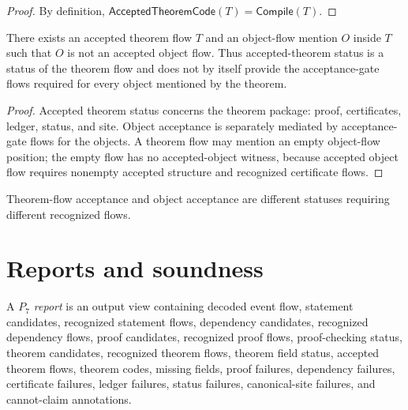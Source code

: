 \begin{proof}
By definition, $\mathsf{AcceptedTheoremCode}(T)=\mathsf{Compile}(T)$.
\end{proof}

\begin{theorem}
\label{thm:theorem-proof-accepted-theorem-not-object}
There exists an accepted theorem flow $T$ and an object-flow mention $O$ inside $T$ such that $O$ is not an accepted object flow. Thus accepted-theorem status is a status of the theorem flow and does not by itself provide the acceptance-gate flows required for every object mentioned by the theorem.
\end{theorem}

\begin{proof}
Accepted theorem status concerns the theorem package: proof, certificates, ledger, status, and site. Object acceptance is separately mediated by acceptance-gate flows for the objects. A theorem flow may mention an empty object-flow position; the empty flow has no accepted-object witness, because accepted object flow requires nonempty accepted structure and recognized certificate flows.
\end{proof}

\begin{corollary}
\label{cor:theorem-proof-theorem-object-acceptance-distinct}
Theorem-flow acceptance and object acceptance are different statuses requiring different recognized flows.
\end{corollary}

\section{Reports and soundness}
\label{sec:theorem-proof-reports-soundness}

\begin{definition}[$P_7$ report]
\label{def:theorem-proof-p7-report}
A \emph{$P_7$ report} is an output view containing decoded event flow, statement candidates, recognized statement flows, dependency candidates, recognized dependency flows, proof candidates, recognized proof flows, proof-checking status, theorem candidates, recognized theorem flows, theorem field status, accepted theorem flows, theorem codes, missing fields, proof failures, dependency failures, certificate failures, ledger failures, status failures, canonical-site failures, and cannot-claim annotations.
\end{definition}

